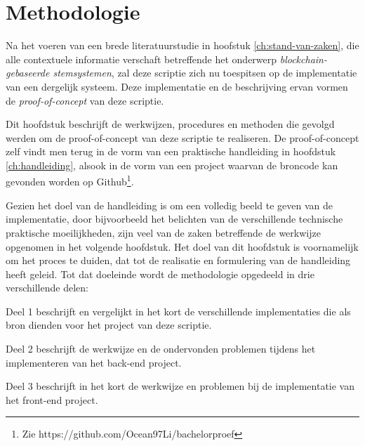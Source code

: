 
\chapter{Methodologie}
\label{ch:methodologie}

Na het voeren van een brede literatuurstudie in hoofstuk \ref{ch:stand-van-zaken}, die  alle contextuele informatie verschaft betreffende het onderwerp \textit{blockchain-gebaseerde stemsystemen}, zal deze scriptie zich nu toespitsen op de implementatie van een dergelijk systeem. Deze implementatie en de beschrijving ervan vormen de  \textit{proof-of-concept} van deze scriptie.

 Dit hoofdstuk beschrijft de werkwijzen, procedures en methoden die gevolgd werden om de  proof-of-concept van deze scriptie te realiseren. De proof-of-concept zelf vindt men terug in de vorm van een praktische handleiding in hoofdstuk \ref{ch:handleiding}, alsook in de vorm van een project waarvan de broncode kan gevonden worden op Github\footnote{Zie https://github.com/Ocean97Li/bachelorproef}.
 
 Gezien het doel van de handleiding is om een volledig beeld te geven van de implementatie, door bijvoorbeeld het belichten van de verschillende technische praktische moeilijkheden, zijn veel van de zaken betreffende de werkwijze opgenomen in het volgende hoofdstuk. Het doel van dit hoofdstuk is voornamelijk om het proces te duiden, dat tot de realisatie en formulering van de handleiding heeft geleid. Tot dat doeleinde wordt de methodologie opgedeeld in drie verschillende delen:

Deel 1 beschrijft en vergelijkt in het kort de verschillende implementaties die als bron dienden voor het project van deze scriptie.

Deel 2 beschrijft de werkwijze en de ondervonden problemen tijdens het implementeren van het back-end project.

Deel 3 beschrijft in het kort de werkwijze en problemen bij de implementatie van het front-end project.

